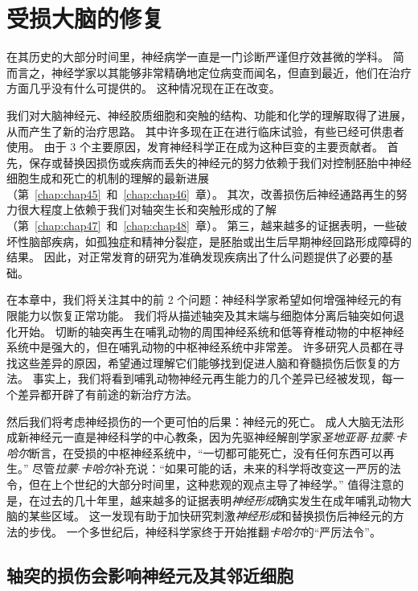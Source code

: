 \chapter{受损大脑的修复} \label{chap:chap50}

在其历史的大部分时间里，神经病学一直是一门诊断严谨但疗效甚微的学科。
简而言之，神经学家以其能够非常精确地定位病变而闻名，但直到最近，他们在治疗方面几乎没有什么可提供的。
这种情况现在正在改变。


我们对大脑神经元、神经胶质细胞和突触的结构、功能和化学的理解取得了进展，从而产生了新的治疗思路。
其中许多现在正在进行临床试验，有些已经可供患者使用。
由于 3 个主要原因，发育神经科学正在成为这种巨变的主要贡献者。
首先，保存或替换因损伤或疾病而丢失的神经元的努力依赖于我们对控制胚胎中神经细胞生成和死亡的机制的理解的最新进展（第~\ref{chap:chap45}~和~\ref{chap:chap46}~章）。
其次，改善损伤后神经通路再生的努力很大程度上依赖于我们对轴突生长和突触形成的了解（第~\ref{chap:chap47}~和~\ref{chap:chap48}~章）。
第三，越来越多的证据表明，一些破坏性脑部疾病，如孤独症和精神分裂症，是胚胎或出生后早期神经回路形成障碍的结果。
因此，对正常发育的研究为准确发现疾病出了什么问题提供了必要的基础。


在本章中，我们将关注其中的前 2 个问题：神经科学家希望如何增强神经元的有限能力以恢复正常功能。
我们将从描述轴突及其末端与细胞体分离后轴突如何退化开始。
切断的轴突再生在哺乳动物的周围神经系统和低等脊椎动物的中枢神经系统中是强大的，但在哺乳动物的中枢神经系统中非常差。
许多研究人员都在寻找这些差异的原因，希望通过理解它们能够找到促进人脑和脊髓损伤后恢复的方法。
事实上，我们将看到哺乳动物神经元再生能力的几个差异已经被发现，每一个差异都开辟了有前途的新治疗方法。


然后我们将考虑神经损伤的一个更可怕的后果：神经元的死亡。
成人大脑无法形成新神经元一直是神经科学的中心教条，因为先驱神经解剖学家\textit{圣地亚哥$\cdot$拉蒙$\cdot$卡哈尔}断言，在受损的中枢神经系统中，“一切都可能死亡，没有任何东西可以再生。” 
尽管\textit{拉蒙$\cdot$卡哈尔}补充说：“如果可能的话，未来的科学将改变这一严厉的法令，但在上个世纪的大部分时间里，这种悲观的观点主导了神经学。”
值得注意的是，在过去的几十年里，越来越多的证据表明\textit{神经形成}确实发生在成年哺乳动物大脑的某些区域。
这一发现有助于加快研究刺激\textit{神经形成}和替换损伤后神经元的方法的步伐。
一个多世纪后，神经科学家终于开始推翻\textit{卡哈尔}的“严厉法令”。



\section{轴突的损伤会影响神经元及其邻近细胞}

